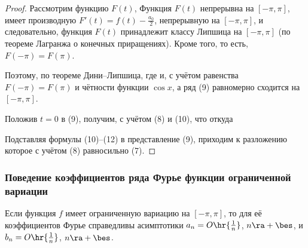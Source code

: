 \documentclass[a4paper]{article}
\begin{document}
\begin{proof}
Рассмотрим функцию $F(t)$,  Функция $F(t)$ непрерывна на
$[-\pi,\pi]$, имеет производную $F'(t)=f(t)-\frac{a_0}2$,
непрерывную на $[-\pi,\pi]$, и следовательно, функция $F(t)$
принадлежит классу Липшица на $[-\pi,\pi]$ (по теореме Лагранжа о
конечных приращениях). Кроме того,  то есть, $F(-\pi)=F(\pi)$.

Поэтому, по теореме Дини--Липшица,  где
 и, с учётом равенства $F(-\pi)=F(\pi)$ и чётности
функции $\cos x$,  а ряд (9) равномерно сходится на
$[-\pi,\pi]$.

Положив $t=0$ в (9), получим, с учётом (8) и (10), что 
откуда 

Подставляя формулы (10)--(12) в представление (9), приходим к
разложению  которое с учётом (8) равносильно
(7).
\end{proof}

\subsubsection{Поведение коэффициентов ряда Фурье функции
ограниченной вариации}

\begin{theorem}
Если функция $f$ имеет ограниченную вариацию на $[-\pi,\pi]$, то для
её коэффициентов Фурье справедливы асимптотики $a_n =
O\hr{\frac1n}$, $n\ra+\bes$, и $b_n = O\hr{\frac1n}$, $n\ra+\bes$.
\end{theorem}
\end{document}
